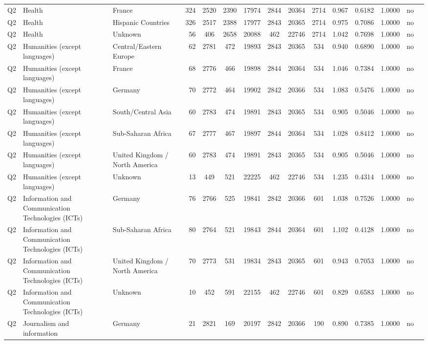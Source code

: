 \begin{longtable}{lllrcccccccccll}
Q2 & Health & France & 324 & 2520 & 2390 & 17974 & 2844 & 20364 & 2714 & 0.967 & 0.6182 & 1.0000 & no \\
Q2 & Health & Hispanic Countries & 326 & 2517 & 2388 & 17977 & 2843 & 20365 & 2714 & 0.975 & 0.7086 & 1.0000 & no \\
Q2 & Health & Unknown & 56 & 406 & 2658 & 20088 & 462 & 22746 & 2714 & 1.042 & 0.7698 & 1.0000 & no \\
Q2 & Humanities (except languages) & Central/Eastern Europe & 62 & 2781 & 472 & 19893 & 2843 & 20365 & 534 & 0.940 & 0.6890 & 1.0000 & no \\
Q2 & Humanities (except languages) & France & 68 & 2776 & 466 & 19898 & 2844 & 20364 & 534 & 1.046 & 0.7384 & 1.0000 & no \\
Q2 & Humanities (except languages) & Germany & 70 & 2772 & 464 & 19902 & 2842 & 20366 & 534 & 1.083 & 0.5476 & 1.0000 & no \\
Q2 & Humanities (except languages) & South/Central Asia & 60 & 2783 & 474 & 19891 & 2843 & 20365 & 534 & 0.905 & 0.5046 & 1.0000 & no \\
Q2 & Humanities (except languages) & Sub-Saharan Africa & 67 & 2777 & 467 & 19897 & 2844 & 20364 & 534 & 1.028 & 0.8412 & 1.0000 & no \\
Q2 & Humanities (except languages) & United Kingdom / North America & 60 & 2783 & 474 & 19891 & 2843 & 20365 & 534 & 0.905 & 0.5046 & 1.0000 & no \\
Q2 & Humanities (except languages) & Unknown & 13 & 449 & 521 & 22225 & 462 & 22746 & 534 & 1.235 & 0.4314 & 1.0000 & no \\
Q2 & Information and Communication Technologies (ICTs) & Germany & 76 & 2766 & 525 & 19841 & 2842 & 20366 & 601 & 1.038 & 0.7526 & 1.0000 & no \\
Q2 & Information and Communication Technologies (ICTs) & Sub-Saharan Africa & 80 & 2764 & 521 & 19843 & 2844 & 20364 & 601 & 1.102 & 0.4128 & 1.0000 & no \\
Q2 & Information and Communication Technologies (ICTs) & United Kingdom / North America & 70 & 2773 & 531 & 19834 & 2843 & 20365 & 601 & 0.943 & 0.7053 & 1.0000 & no \\
Q2 & Information and Communication Technologies (ICTs) & Unknown & 10 & 452 & 591 & 22155 & 462 & 22746 & 601 & 0.829 & 0.6583 & 1.0000 & no \\
Q2 & Journalism and information & Germany & 21 & 2821 & 169 & 20197 & 2842 & 20366 & 190 & 0.890 & 0.7385 & 1.0000 & no \\

\end{longtable}
